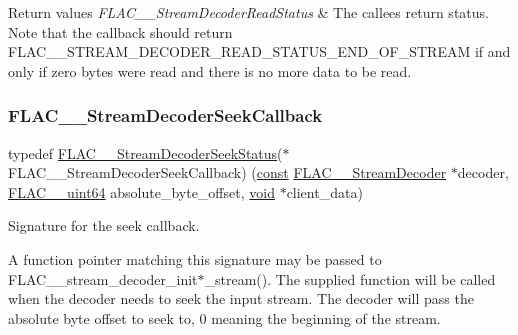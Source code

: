 \begin{DoxyRetVals}{Return values}
{\em F\+L\+A\+C\+\_\+\+\_\+\+Stream\+Decoder\+Read\+Status} & The callee\textquotesingle{}s return status. Note that the callback should return {\ttfamily F\+L\+A\+C\+\_\+\+\_\+\+S\+T\+R\+E\+A\+M\+\_\+\+D\+E\+C\+O\+D\+E\+R\+\_\+\+R\+E\+A\+D\+\_\+\+S\+T\+A\+T\+U\+S\+\_\+\+E\+N\+D\+\_\+\+O\+F\+\_\+\+S\+T\+R\+E\+AM} if and only if zero bytes were read and there is no more data to be read. \\
\hline
\end{DoxyRetVals}
\mbox{\label{group__flac__stream__decoder_ga4c18b0216e0f7a83d7e4e7001230545d}} 
\subsubsection{\texorpdfstring{F\+L\+A\+C\+\_\+\+\_\+\+Stream\+Decoder\+Seek\+Callback}{FLAC\_\_StreamDecoderSeekCallback}}
{\footnotesize\ttfamily typedef \hyperlink{group__flac__stream__decoder_gac8d269e3c7af1a5889d3bd38409ed67d}{F\+L\+A\+C\+\_\+\+\_\+\+Stream\+Decoder\+Seek\+Status}($\ast$ F\+L\+A\+C\+\_\+\+\_\+\+Stream\+Decoder\+Seek\+Callback) (\hyperlink{zconf_8h_a2c212835823e3c54a8ab6d95c652660e}{const} \hyperlink{struct_f_l_a_c_____stream_decoder}{F\+L\+A\+C\+\_\+\+\_\+\+Stream\+Decoder} $\ast$decoder, \hyperlink{ordinals_8h_aa78c8c70a3eb8a58af7436f278acde8e}{F\+L\+A\+C\+\_\+\+\_\+uint64} absolute\+\_\+byte\+\_\+offset, \hyperlink{png_8h_ac9c84fa68bbad002983e35ce3663c686}{void} $\ast$client\+\_\+data)}

Signature for the seek callback.

A function pointer matching this signature may be passed to F\+L\+A\+C\+\_\+\+\_\+stream\+\_\+decoder\+\_\+init$\ast$\+\_\+stream(). The supplied function will be called when the decoder needs to seek the input stream. The decoder will pass the absolute byte offset to seek to, 0 meaning the beginning of the stream.

